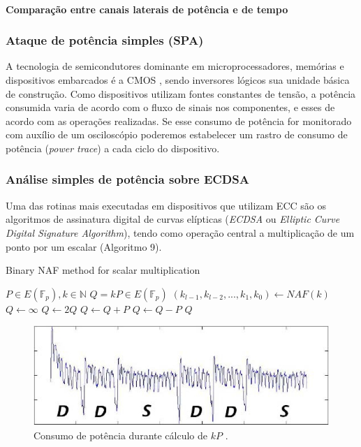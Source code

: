 \paragraph{Comparação entre canais laterais de potência e de tempo}

\subsubsection{Ataque de potência simples (SPA)}
A tecnologia de semicondutores dominante em microprocessadores, mem\'{o}rias e dispositivos embarcados \'{e} a CMOS   \cite{sedra:1997}, sendo inversores l\'{o}gicos sua unidade b\'{a}sica de constru\c{c}\~{a}o. Como dispositivos utilizam fontes constantes de tens\~{a}o, a pot\^{e}ncia consumida varia de acordo com o fluxo de sinais nos componentes, e esses de acordo com as opera\c{c}\~{o}es realizadas. Se esse consumo de pot\^{e}ncia for monitorado com aux\'{i}lio de um oscilosc\'{o}pio poderemos estabelecer um rastro de consumo de pot\^{e}ncia (\textit{power trace}) a cada ciclo do dispositivo.

\subsubsection{An\'{a}lise simples de pot\^{e}ncia sobre ECDSA}
Uma das rotinas mais executadas em dispositivos que utilizam ECC s\~{a}o os algoritmos de assinatura digital de curvas el\'{i}pticas (\textit{ECDSA} ou \textit{Elliptic Curve Digital Signature Algorithm}), tendo como opera\c{c}\~{a}o central a multiplica\c{c}\~{a}o de um ponto por um escalar (Algoritmo 9).

\begin{algorithm}[H]
\caption{Binary NAF method for scalar multiplication}
\begin{algorithmic}
    \REQUIRE $P \in E(\mathbb{F}_p), k \in \mathbb{N}$
    \ENSURE $Q = kP \in E(\mathbb{F}_p)$
    \STATE $(k_{l-1}, k_{l-2}, ..., k_{1}, k_{0}) \leftarrow NAF(k)$
    \STATE $Q \leftarrow \infty$
        \STATE $Q \leftarrow 2Q$
            \STATE $Q \leftarrow Q + P$
        \ENDIF
            \STATE $Q \leftarrow Q - P$
        \ENDIF
    \ENDFOR
    \RETURN $Q$
    \end{algorithmic}
\end{algorithm}

\begin{figure}[ht]
	\centering
	\includegraphics[width=.8\textwidth]{figures/spa1.jpg}
	\caption{Consumo de pot\^{e}ncia durante c\'{a}lculo de $kP$ \cite{ECCBook_HankersonVanstone2004}.}
	\label{fig:Fig5}
\end{figure}

